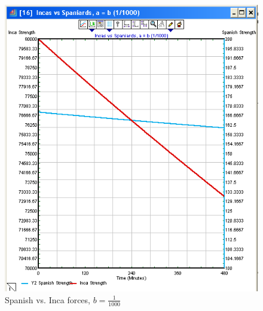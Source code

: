 \documentclass[letterpaper,10pt]{article}
\begin{document}
\begin{figure}[h!tp]
\begin{center}
\includegraphics[scale=0.4]{fig3b.png}
\caption{Spanish vs. Inca forces, $b=\frac{1}{1000}$}
\label{fig3b}
\end{center}
\end{figure}
\end{document}
